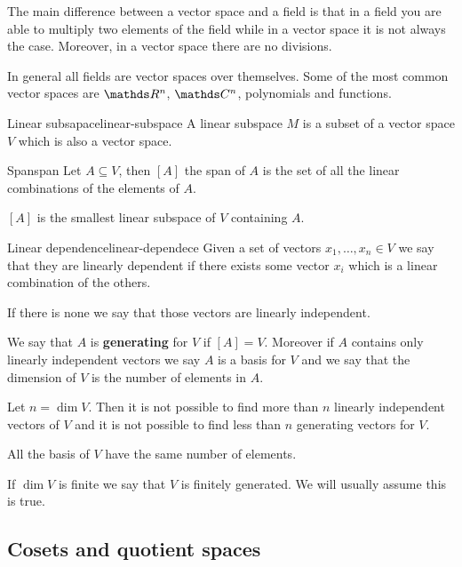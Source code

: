 \documentclass[12pt]{extarticle}
\begin{document}
The main difference between a vector space and a field is that in a field you are able to multiply two elements of the field while in a vector space it is not always the case. Moreover, in a vector space there are no divisions.

In general all fields are vector spaces over themselves.
Some of the most common vector spaces are $\R^n$, $\C^n$, polynomials and functions.

\begin{definition}{Linear subsapace}{linear-subspace}
	A linear subspace $M$ is a subset of a vector space $V$ which is also a vector space.
\end{definition}

\begin{definition}{Span}{span}
	Let $A \subseteq V$, then $[A]$ the span of $A$ is the set of all the linear combinations of the elements of $A$.
\end{definition}

\begin{lemma}{}{}
	$[A]$ is the smallest linear subspace of $V$ containing $A$.
\end{lemma}

\begin{definition}{Linear dependence}{linear-dependece}
	Given a set of vectors $x_1, \dots, x_n \in V$ we say that they are linearly dependent if there exists some vector $x_i$ which is a linear combination of the others.

	If there is none we say that those vectors are linearly independent.
\end{definition}

We say that $A$ is \textbf{generating} for $V$ if $[A] = V$. Moreover if $A$ contains only linearly independent vectors we say $A$ is a basis for $V$ and we say that the dimension of $V$ is the number of elements in $A$.

\begin{theorem}{}{}
	Let $n = \dim V$. Then it is not possible to find more than $n$ linearly independent vectors of $V$ and it is not possible to find less than $n$ generating vectors for $V$.

	All the basis of $V$ have the same number of elements.
\end{theorem}

If $\dim V$ is finite we say that $V$ is finitely generated. We will usually assume this is true.

\subsection{Cosets and quotient spaces}
\end{document}
